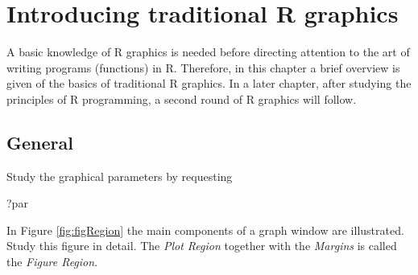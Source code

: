 \documentclass[
]{book}
\newenvironment{Shaded}{\begin{snugshade}}{\end{snugshade}}
\newcommand{\NormalTok}[1]{#1}
\begin{document}
\chapter{Introducing traditional R graphics}\label{graphics}

A basic knowledge of R graphics is needed before directing attention to the art of writing programs (functions) in R. Therefore, in this chapter a brief overview is given of the basics of traditional R graphics. In a later chapter, after studying the principles of R programming, a second round of R graphics will follow.

\section{General}\label{general-1}

Study the graphical parameters by requesting

\begin{Shaded}
\begin{Highlighting}[]
\NormalTok{?par}
\end{Highlighting}
\end{Shaded}

In Figure \ref{fig:figRegion} the main components of a graph window are illustrated. Study this figure in detail. The \emph{{Plot Region}} together with the \emph{{Margins}} is called the \emph{{Figure Region}}.
\end{document}
